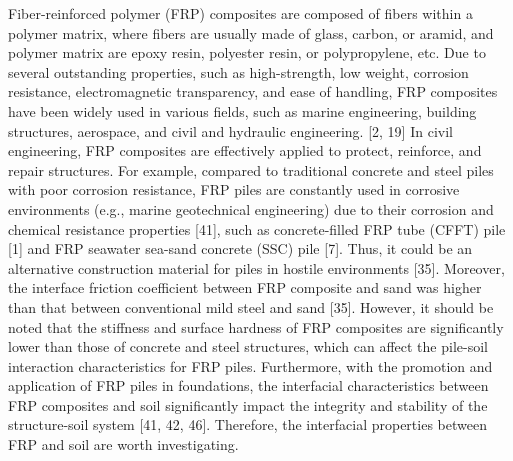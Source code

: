 \documentclass{article}
\begin{document}
Fiber-reinforced polymer (FRP) composites are composed of fibers within a polymer matrix, where fibers are usually made of glass, carbon, or aramid, and polymer matrix are epoxy resin, polyester resin, or polypropylene, etc. Due to several outstanding properties, such as high-strength, low weight, corrosion resistance, electromagnetic transparency, and ease of handling, FRP composites have been widely used in various fields, such as marine engineering, building structures, aerospace, and civil and hydraulic engineering. [2, 19] In civil engineering, FRP composites are effectively applied to protect, reinforce, and repair structures. For example, compared to traditional concrete and steel piles with poor corrosion resistance, FRP piles are constantly used in corrosive environments (e.g., marine geotechnical engineering) due to their corrosion and chemical resistance properties [41], such as concrete-filled FRP tube (CFFT) pile [1] and FRP seawater sea-sand concrete (SSC) pile [7]. Thus, it could be an alternative construction material for piles in hostile environments [35]. Moreover, the interface friction coefficient between FRP composite and sand was higher than that between conventional mild steel and sand [35]. However, it should be noted that the stiffness and surface hardness of FRP composites are significantly lower than those of concrete and steel structures, which can affect the pile-soil interaction characteristics for FRP piles. Furthermore, with the promotion and application of FRP piles in foundations, the interfacial characteristics between FRP composites and soil significantly impact the integrity and stability of the structure-soil system [41, 42, 46]. Therefore, the interfacial properties between FRP and soil are worth investigating.
\end{document}
